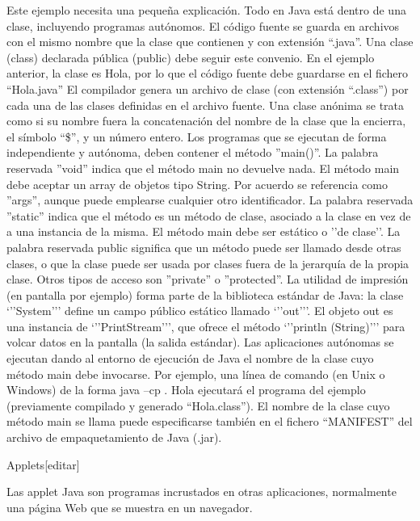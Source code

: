 \documentclass[11pt,a4paper]{book}
\begin{document}
	\bigskip
							Este ejemplo necesita una pequeña explicación.
	\bigskip
							Todo en Java está dentro de una clase, incluyendo programas autónomos.
	\bigskip
							El código fuente se guarda en archivos con el mismo nombre que la clase que contienen y con extensión “.java”. Una clase (class) declarada pública (public) debe seguir este convenio. En el ejemplo anterior, la clase es Hola, por lo que el código fuente debe guardarse en el fichero “Hola.java”
	\bigskip
							El compilador genera un archivo de clase (con extensión “.class”) por cada una de las clases definidas en el archivo fuente. Una clase anónima se trata como si su nombre fuera la concatenación del nombre de la clase que la encierra, el símbolo “\$”, y un número entero.
	\bigskip
							Los programas que se ejecutan de forma independiente y autónoma, deben contener el método ”main()”.
	\bigskip
							La palabra reservada ”void” indica que el método main no devuelve nada.
	\bigskip
							El método main debe aceptar un array de objetos tipo String. Por acuerdo se referencia como ”args”, aunque puede emplearse cualquier otro identificador.
	\bigskip
							La palabra reservada ”static” indica que el método es un método de clase, asociado a la clase en vez de a una instancia de la misma. El método main debe ser estático o ’’de clase’’.
	\bigskip
							La palabra reservada public significa que un método puede ser llamado desde otras clases, o que la clase puede ser usada por clases fuera de la jerarquía de la propia clase. Otros tipos de acceso son ”private” o ”protected”.
	\bigskip
							La utilidad de impresión (en pantalla por ejemplo) forma parte de la biblioteca estándar de Java: la clase ‘’’System’’’ define un campo público estático llamado ‘’’out’’’. El objeto out es una instancia de ‘’’PrintStream’’’, que ofrece el método ‘’’println (String)’’’ para volcar datos en la pantalla (la salida estándar).
	\bigskip
							Las aplicaciones autónomas se ejecutan dando al entorno de ejecución de Java el nombre de la clase cuyo método main debe invocarse. Por ejemplo, una línea de comando (en Unix o Windows) de la forma java –cp . Hola ejecutará el programa del ejemplo (previamente compilado y generado “Hola.class”). El nombre de la clase cuyo método main se llama puede especificarse también en el fichero “MANIFEST” del archivo de empaquetamiento de Java (.jar).
	\bigskip
							
	\bigskip
							Applets[editar]
	\bigskip
							
	\bigskip
							Las applet Java son programas incrustados en otras aplicaciones, normalmente una página Web que se muestra en un navegador.
	\bigskip
							
\end{document}
